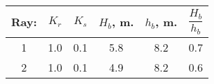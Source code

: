 \begin{tabular}{cccccc}
Ray: & $K_{r}$ & $K_{s}$ & $H_{b}$, m. & $h_{b}$, m. & $\dfrac{H_{b}}{h_{b}}$ \\
\hline
1 & 1.0 & 0.1 & 5.8 & 8.2 & 0.7 \\
2 & 1.0 & 0.1 & 4.9 & 8.2 & 0.6 \\
\hline
\end{tabular}
